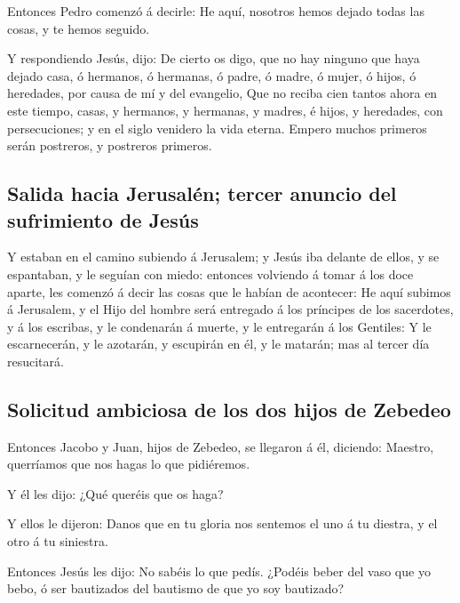  Entonces Pedro comenzó á decirle: He aquí, nosotros
hemos dejado todas las cosas, y te hemos seguido.

 Y respondiendo Jesús, dijo: De cierto os digo, que no
hay ninguno que haya dejado casa, ó hermanos, ó hermanas, ó padre, ó
madre, ó mujer, ó hijos, ó heredades, por causa de mí y del evangelio,
 Que no reciba cien tantos ahora en este tiempo, casas, y
hermanos, y hermanas, y madres, é hijos, y heredades, con persecuciones;
y en el siglo venidero la vida eterna.  Empero muchos
primeros serán postreros, y postreros primeros.

\hypertarget{salida-hacia-jerusaluxe9n-tercer-anuncio-del-sufrimiento-de-jesuxfas}{%
\subsection{Salida hacia Jerusalén; tercer anuncio del sufrimiento de
Jesús}\label{salida-hacia-jerusaluxe9n-tercer-anuncio-del-sufrimiento-de-jesuxfas}}

 Y estaban en el camino subiendo á Jerusalem; y Jesús iba
delante de ellos, y se espantaban, y le seguían con miedo: entonces
volviendo á tomar á los doce aparte, les comenzó á decir las cosas que
le habían de acontecer:  He aquí subimos á Jerusalem, y
el Hijo del hombre será entregado á los príncipes de los sacerdotes, y á
los escribas, y le condenarán á muerte, y le entregarán á los Gentiles:
 Y le escarnecerán, y le azotarán, y escupirán en él, y
le matarán; mas al tercer día resucitará.

\hypertarget{solicitud-ambiciosa-de-los-dos-hijos-de-zebedeo}{%
\subsection{Solicitud ambiciosa de los dos hijos de
Zebedeo}\label{solicitud-ambiciosa-de-los-dos-hijos-de-zebedeo}}

 Entonces Jacobo y Juan, hijos de Zebedeo, se llegaron á
él, diciendo: Maestro, querríamos que nos hagas lo que pidiéremos.

 Y él les dijo: ¿Qué queréis que os haga?

 Y ellos le dijeron: Danos que en tu gloria nos sentemos
el uno á tu diestra, y el otro á tu siniestra.

 Entonces Jesús les dijo: No sabéis lo que pedís. ¿Podéis
beber del vaso que yo bebo, ó ser bautizados del bautismo de que yo soy
bautizado?

